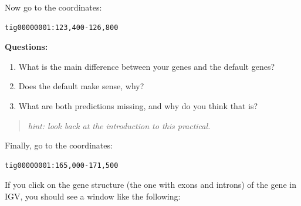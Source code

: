 \documentclass[11pt]{article}
\providecommand{\tightlist}{%
      \setlength{\itemsep}{0pt}\setlength{\parskip}{0pt}}
\begin{document}
Now go to the coordinates:

\begin{verbatim}
tig00000001:123,400-126,800
\end{verbatim}

\textbf{Questions:}

\begin{enumerate}
\def\labelenumi{\arabic{enumi}.}
\tightlist
\item
  What is the main difference between your genes and the default genes?
\item
  Does the default make sense, why?
\item
  What are both predictions missing, and why do you think that is?
\end{enumerate}

\begin{quote}
\textit{hint: look back at the introduction to this practical.}
\end{quote}

Finally, go to the coordinates:

\begin{verbatim}
tig00000001:165,000-171,500
\end{verbatim}

If you click on the gene structure (the one with exons and introns) of
the gene in IGV, you should see a window like the following:
\end{document}
